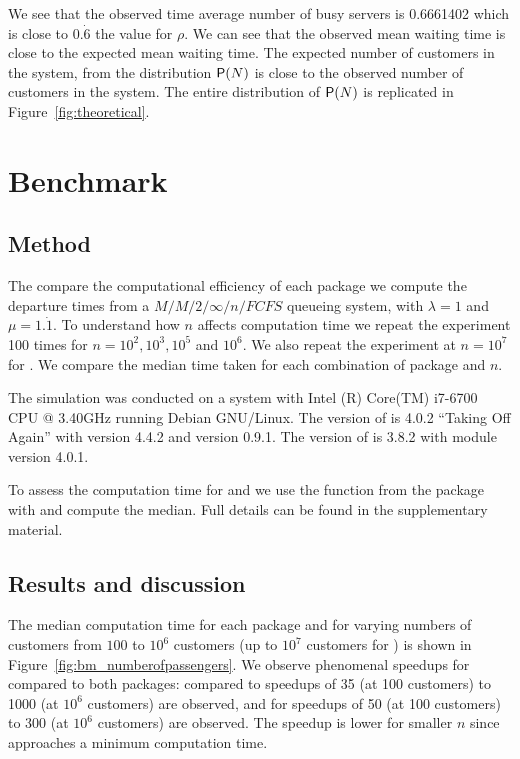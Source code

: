 \documentclass[article]{jss}
\begin{document}
We see that the observed time average number of busy servers is 0.6661402 which is close to $0.\dot{6}$ the value for $\rho$. We can see that the observed mean waiting time is close to the expected mean waiting time. The expected number of customers in the system, from the distribution $\mathsf{P}(N)$ is close to the observed number of customers in the system. The entire distribution of $\mathsf{P}(N)$ is replicated in Figure~\ref{fig:theoretical}. 

\section{Benchmark} \label{sec:Benchmark}

\subsection{Method}

The compare the computational efficiency of each package we compute
the departure times from a $M/M/2/\infty/n/\mathit{FCFS}$ queueing
system, with $\lambda = 1$ and $\mu = 1.\dot{1}$. To understand how
$n$ affects computation time we repeat the experiment 100 times for
$n = 10^2, 10^3, 10^5$ and $10^6 $. We also repeat the experiment at
$n = 10^7$ for . We compare the median time taken
for each combination of package and $n$.

The simulation was conducted on a system with Intel (R) Core(TM) i7-6700 CPU @ 3.40GHz running Debian GNU/Linux. The version of  is 4.0.2 ``Taking Off Again'' with  version 4.4.2 and  version 0.9.1. The version of  is 3.8.2 with  module version 4.0.1.

To assess the computation time for  and  we use the  function from the  package \citep{Rpkg_microbenchmark} with  and compute the median. Full details can be found in the supplementary material. 

\subsection{Results and discussion}

The median computation time for each package and for varying numbers of customers from $100$ to $10^6$ customers (up to $10^7$ customers for ) is shown in Figure~\ref{fig:bm_numberofpassengers}. We observe phenomenal speedups for  compared to both packages: compared to  speedups of 35 (at 100 customers) to 1000 (at $10^6$ customers) are observed, and for  speedups of 50 (at 100 customers) to 300 (at $10^6$ customers) are observed. The speedup is lower for smaller $n$ since  approaches a minimum computation time. 
\end{document}
